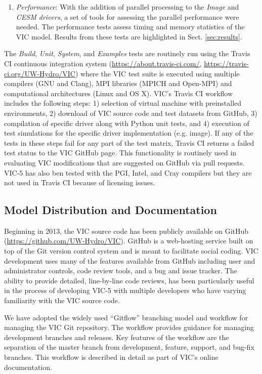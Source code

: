 \documentclass[gmd, manuscript]{copernicus}
\begin{document}
\begin{enumerate}
      \item \textit{Performance}: With the addition of parallel processing to the \textit{Image} and \textit{CESM drivers}, a set of tools for assessing the parallel performance were needed. The performance tests assess timing and memory statistics of the VIC model. Results from these tests are highlighted in Sect. \ref{sec:results}.
    \end{enumerate}

    The \textit{Build}, \textit{Unit}, \textit{System}, and \textit{Examples} tests are routinely run using the Travis CI continuous integration system (\url{https://about.travis-ci.com/}, \url{https://travis-ci.org/UW-Hydro/VIC}) where the VIC test suite is executed using multiple compilers (GNU and Clang), MPI libraries (MPICH and Open-MPI) and computational architectures (Linux and OS X). VIC's Travis CI workflow includes the following steps: 1) selection of virtual machine with preinstalled environments, 2) download of VIC source code and test datasets from GitHub, 3) compilation of specific driver along with Python unit tests, and 4) execution of test simulations for the specific driver implementation (e.g. image). If any of the tests in these steps fail for any part of the test matrix, Travis CI returns a failed test status to the VIC GitHub page. This functionality is routinely used in evaluating VIC modifications that are suggested on GitHub via pull requests. VIC-5 has also ben tested with the PGI, Intel, and Cray compilers but they are not used in Travis CI because of licensing issues.

  \subsection{Model Distribution and Documentation}

    Beginning in 2013, the VIC source code has been publicly available on GitHub (\url{https://github.com/UW-Hydro/VIC}). GitHub is a web-hosting service built on top of the Git version control system and is meant to facilitate social coding. VIC development uses many of the features available from GitHub including user and administrator controls, code review tools, and a bug and issue tracker. The ability to provide detailed, line-by-line code reviews, has been particularly useful in the process of developing VIC-5 with multiple developers who have varying familiarity with the VIC source code.

    We have adopted the widely used ``Gitflow'' branching model and workflow for managing the VIC Git repository. The workflow provides guidance for managing development branches and releases. Key features of the workflow are the separation of the master branch from development, feature, support, and bug-fix branches. This workflow is described in detail as part of VIC's online documentation.
\end{document}
